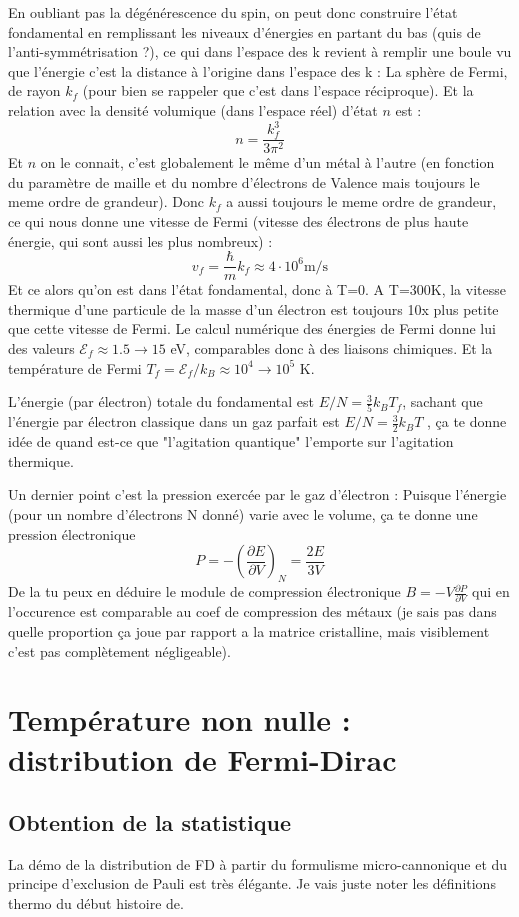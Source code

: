 \documentclass[a4paper]{report}
\begin{document}
 En oubliant pas la dégénérescence du spin, on peut donc construire l'état fondamental en remplissant les niveaux d'énergies en partant du bas (quis de l'anti-symmétrisation ?), ce qui dans l'espace des k revient à remplir une boule vu que l'énergie c'est la distance à l'origine dans l'espace des k : La sphère de Fermi, de rayon $k_f$ (pour bien se rappeler que c'est dans l'espace réciproque). Et la relation avec la densité volumique (dans l'espace réel) d'état $n$ est : $$n=\frac{k_f^3}{3\pi^2}$$ Et $n$ on le connait, c'est globalement le même d'un métal à l'autre (en fonction du paramètre de maille et du nombre d'électrons de Valence mais toujours le meme ordre de grandeur). Donc $k_f$ a aussi toujours le meme ordre de grandeur, ce qui nous donne une vitesse de Fermi (vitesse des électrons de plus haute énergie, qui sont aussi les plus nombreux) : $$ v_f = \frac{\hbar}{m} k_f \approx 4 \cdot 10^6 \mathrm{m/s} $$
 Et ce alors qu'on est dans l'état fondamental, donc à T=0. A T=300K, la vitesse thermique d'une particule de la masse d'un électron est toujours 10x plus petite que cette vitesse de Fermi. Le calcul numérique des énergies de Fermi donne lui des valeurs $\mathcal{E}_f \approx 1.5 \to 15 $ eV, comparables donc à des liaisons chimiques. Et la température de Fermi $T_f=\mathcal{E}_f/k_B \approx 10^4 \to 10^5$ K. 
 
 L'énergie (par électron) totale du fondamental est $E/N= \frac{3}{5} k_B T_f$, sachant que l'énergie par électron classique dans un gaz parfait est $E/N= \frac{3}{2} k_B T$ , ça te donne idée de quand est-ce que "l'agitation quantique" l'emporte sur l'agitation thermique.
 
 Un dernier point c'est la pression exercée par le gaz d'électron : Puisque l'énergie (pour un nombre d'électrons N donné) varie avec le volume, ça te donne une pression électronique$$P=-\left(\frac{\partial E}{\partial V}\right)_N=\frac{2E}{3V}$$ De la tu peux en déduire le module de compression électronique $B=-V\frac{\partial P}{\partial V}$ qui en l'occurence est comparable au coef de compression des métaux (je sais pas dans quelle proportion ça joue par rapport a la matrice cristalline, mais visiblement c'est pas complètement négligeable).
 
 \section{Température non nulle : distribution de Fermi-Dirac}
 
 \subsection{Obtention de la statistique}
 La démo de la distribution de FD à partir du formulisme micro-cannonique et du principe d'exclusion de Pauli est très élégante. Je vais juste noter les définitions thermo du début histoire de.
 
\end{document}
